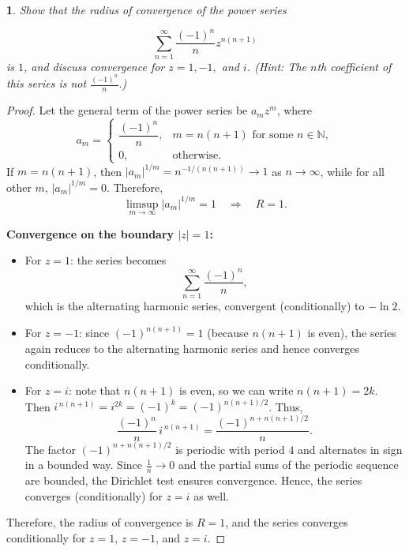 \documentclass[12pt, a4paper]{report}
\theoremstyle{spaced}
\newtheorem{exercise}{}
\newcommand{\setexercise}[1]{\setcounter{exercise}{#1-1}}
\begin{document}
\setexercise{7}
\begin{exercise}
	Show that the radius of convergence of the power series

	\[
		\sum_{n=1}^{\infty} \frac{(-1)^n}{n} z^{n(n+1)}
	\]
	is $1$, and discuss convergence for $z = 1, -1,$ and $i$.
	(Hint: The $n$th coefficient of this series is not $\displaystyle \frac{(-1)^n}{n}.$)
\end{exercise}

\begin{proof}
	Let the general term of the power series be $a_m z^m$, where
	\[
		a_m =
		\begin{cases}
			\dfrac{(-1)^n}{n}, & m = n(n+1) \text{ for some } n \in \mathbb{N}, \\[6pt]
			0,                 & \text{otherwise}.
		\end{cases}
	\]
	If $m = n(n+1)$, then $|a_m|^{1/m} = n^{-1/(n(n+1))} \to 1$ as $n \to \infty$, while for all other $m$, $|a_m|^{1/m} = 0$.
	Therefore,
	\[
		\limsup_{m \to \infty} |a_m|^{1/m} = 1 \quad \Longrightarrow \quad R = 1.
	\]

	\smallskip
	\textbf{Convergence on the boundary $|z|=1$:}
	\begin{itemize}
		\item For $z = 1$: the series becomes
		      \[
			      \sum_{n=1}^{\infty} \frac{(-1)^n}{n},
		      \]
		      which is the alternating harmonic series, convergent (conditionally) to $-\ln 2$.

		\item For $z = -1$: since $(-1)^{n(n+1)} = 1$ (because $n(n+1)$ is even), the series again reduces to the alternating harmonic series and hence converges conditionally.

		\item For $z = i$: note that $n(n+1)$ is even, so we can write $n(n+1) = 2k$. Then $i^{\,n(n+1)} = i^{2k} = (-1)^k = (-1)^{n(n+1)/2}$.
		      Thus,
		      \[
			      \frac{(-1)^n}{n} \, i^{\,n(n+1)} = \frac{(-1)^{n + n(n+1)/2}}{n}.
		      \]
		      The factor $(-1)^{n + n(n+1)/2}$ is periodic with period $4$ and alternates in sign in a bounded way.
		      Since $\frac{1}{n} \to 0$ and the partial sums of the periodic sequence are bounded, the Dirichlet test ensures convergence.
		      Hence, the series converges (conditionally) for $z = i$ as well.
	\end{itemize}

	\noindent Therefore, the radius of convergence is $R = 1$, and the series converges conditionally for $z = 1$, $z = -1$, and $z = i$.
\end{proof}
\end{document}
